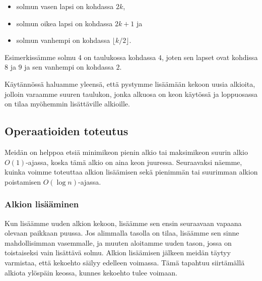 \begin{itemize}
\item solmun vasen lapsi on kohdassa $2k$,
\item solmun oikea lapsi on kohdassa $2k+1$ ja
\item solmun vanhempi on kohdassa $\lfloor k/2 \rfloor$.
\end{itemize}

Esimerkissämme solmu 4
on taulukossa kohdassa $4$,
joten sen lapset ovat kohdissa $8$ ja $9$
ja sen vanhempi on kohdassa $2$.

Käytännössä haluamme yleensä, että pystymme lisäämään kekoon uusia alkioita,
jolloin varaamme suuren taulukon,
jonka alkuosa on keon käytössä ja loppuosassa
on tilaa myöhemmin lisättäville alkioille.

\subsection{Operaatioiden toteutus}

Meidän on helppoa etsiä minimikeon pienin alkio
tai maksimikeon suurin alkio $O(1)$-ajassa,
koska tämä alkio on aina keon juuressa.
Seuraavaksi näemme, kuinka voimme toteuttaa alkion lisäämisen
sekä pienimmän tai suurimman alkion poistamisen $O(\log n)$-ajassa.

\subsubsection{Alkion lisääminen}

Kun lisäämme uuden alkion kekoon, lisäämme sen ensin seuraavaan
vapaana olevaan paikkaan puussa. Jos alimmalla tasolla on tilaa,
lisäämme sen sinne mahdollisimman vasemmalle,
ja muuten aloitamme uuden tason, jossa on toistaiseksi vain lisättävä solmu.
Alkion lisäämisen jälkeen meidän täytyy varmistaa,
että kekoehto säilyy edelleen voimassa.
Tämä tapahtuu siirtämällä alkiota ylöspäin keossa,
kunnes kekoehto tulee voimaan.

